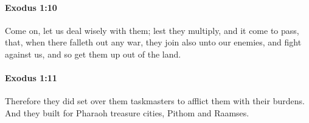 		\paragraph{Exodus 1:10} %
			\label{EXODUS-1-10}

			Come on, let us deal wisely with them; lest they multiply, and it come to pass, that, when there falleth out any war, they join also unto our enemies, and fight against us, and so get them up out of the land.


		\paragraph{Exodus 1:11} %
			\label{EXODUS-1-11}

			Therefore they did set over them taskmasters to afflict them with their burdens. And they built for Pharaoh treasure cities, Pithom and Raamses.


